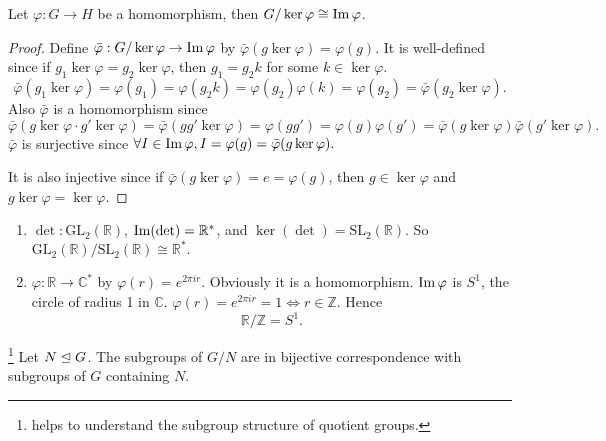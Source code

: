 \documentclass[a4paper]{article}
\begin{document}
    \begin{theorem}\label{thm:1st isom thm}
        Let $ \varphi:G\to H $ be a homomorphism, then $ G/\ker \varphi \cong \operatorname{Im} \varphi $.
    \end{theorem}
    \begin{proof}
        Define $\bar{\varphi}: G/ \ker \varphi\to \operatorname{Im} \varphi $ by $ \bar{\varphi}(g \ker \varphi)=\varphi(g) $. It is well-defined since if $ g_1 \ker \varphi=g_2 \ker \varphi $, then $ g_1=g_2k $ for some $k\in \ker \varphi$.
        \[
            \bar{\varphi}(g_1 \ker \varphi)=\varphi(g_1)=\varphi(g_2 k)=\varphi(g_2)\varphi(k)=\varphi(g_2)=\bar{\varphi}(g_2 \ker \varphi)
        .\]
        Also $ \bar{\varphi} $ is a homomorphism since 
        \[
            \bar{\varphi}(g \ker \varphi \cdot g' \ker \varphi)=\bar{\varphi}(gg' \ker \varphi)=\varphi(gg')=\varphi(g)\varphi(g')=\bar{\varphi}(g \ker \varphi) \bar{\varphi}(g '\ker \varphi)
        .\]
        $ \bar{\varphi} $ is surjective since $ \forall I\in \operatorname{Im} \varphi, I=\varphi(g)=\bar{\varphi}(g \ker \varphi). $

        It is also injective since if $ \bar{\varphi}(g \ker \varphi)=e=\varphi(g) $, then $ g\in \ker \varphi $ and $ g \ker \varphi = \ker \varphi $.
    \end{proof}
    \begin{example}
        \begin{enumerate}
            \item $ \det : \text{GL}_2( \mathbb{R} ) $, $ \operatorname{Im} (\det )=\mathbb{R}^* $, and $ \ker (\det )=\text{SL}_2(\mathbb{R} ) $. So $ \text{GL}_2( \mathbb{R})/ \text{SL}_2( \mathbb{R}) \cong \mathbb{R}^*.$
            \item $ \varphi: \mathbb{R} \to \mathbb{C}^* $ by $ \varphi(r)=e^{2\pi ir} $. Obviously it is a homomorphism. $ \operatorname{Im} \varphi $ is $S^1$, the circle of radius 1 in $\mathbb{C}$. $ \varphi(r)=e^{2\pi ir}=1 \Leftrightarrow r\in \mathbb{Z} $. Hence 
            \[
                \mathbb{R}/\mathbb{Z}=S^1
            .\]
        \end{enumerate}
    \end{example}
    \begin{theorem}\label{thm:Correspondence theorem}\footnote{helps to understand the subgroup structure of quotient groups.}
        Let $ N \trianglelefteq G $. The subgroups of $G/N$ are in bijective correspondence with subgroups of $G$ containing $N$.
    \end{theorem}
\end{document}

